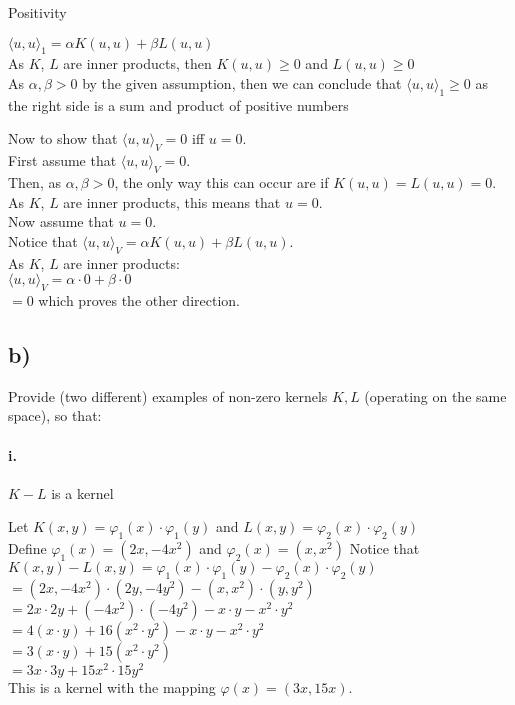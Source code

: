 \documentclass[12pt]{article}
\newcommand\tab[1][1cm]{\hspace*{#1}}
\begin{document}
\tab Positivity

$ \langle u, u \rangle_1 = \alpha K(u, u) + \beta L(u, u) $ \\
As $K$, $L$ are inner products, then $K(u, u) \geq 0$ and $L(u, u) \geq 0$ \\
As $\alpha,\beta > 0$ by the given assumption, then we can conclude that $ \langle u, u \rangle_1 \geq 0 $ as the right side is a sum and product of positive  numbers 

Now to show that $ \langle u, u \rangle_V = 0 $ iff $ u = 0 $. \\
First assume that $ \langle u, u \rangle_V = 0 $. \\
Then, as $\alpha,\beta > 0$, the only way this can occur are if $ K(u, u) = L(u, u) = 0 $. \\ 
As $K$, $L$ are inner products, this means that $ u = 0$. \\
Now assume that $ u = 0 $. \\
Notice that $ \langle u, u \rangle_V = \alpha K(u, u) + \beta L(u, u) $. \\
As $K$, $L$ are inner products: \\
$ \langle u, u \rangle_V = \alpha \cdot 0 + \beta \cdot 0 $ \\
$ = 0 $ which proves the other direction.
		
\subsection*{b)}

Provide (two different) examples of non-zero kernels $K,L$ (operating on the same space), so that:

\paragraph{\tab i.}

$K - L$ is a kernel

Let $K(x,y) = \varphi_1(x)\cdot\varphi_1(y)$ and $L(x,y) = \varphi_2(x)\cdot\varphi_2(y)$ \\
			Define $\varphi_1(x) = (2x, -4x^2)$ and $\varphi_2(x) = (x, x^2) $
			Notice that $ K(x,y) - L(x,y) = \varphi_1(x)\cdot\varphi_1(y) - \varphi_2(x)\cdot\varphi_2(y) $ \\
			$ = (2x, -4x^2)\cdot(2y, -4y^2) - (x, x^2)\cdot(y,y^2) $ \\
			$ = 2x \cdot 2y + (-4x^2) \cdot (-4y^2) - x \cdot y - x^2 \cdot y^2 $ \\
			$ = 4(x \cdot y) + 16(x^2 \cdot y^2) - x \cdot y - x^2 \cdot y^2 $ \\
			$ = 3(x \cdot y) + 15(x^2 \cdot y^2) $ \\
			$ = 3x \cdot 3y + 15x^2 \cdot 15y^2 $ \\
			This is a kernel with the mapping $ \varphi(x) = (3x, 15x) $.
\end{document}

